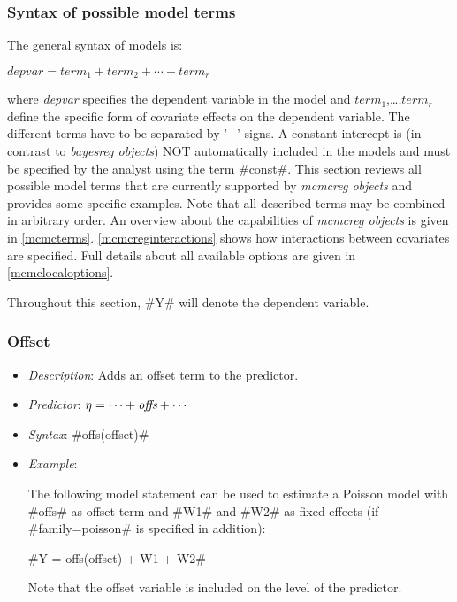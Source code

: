 \subsubsection{Syntax of possible model terms}
\label{mcmcregmodelsyntax}

The general syntax of models is:

$depvar = term_1 + term_2 + \cdots + term_r$

where {\em depvar} specifies the dependent variable in the model
and $term_1$,\dots,$term_r$ define the specific form of covariate
effects on the dependent variable. The different terms have to be
separated by '+' signs. A constant intercept is (in contrast to
{\em bayesreg objects}) NOT automatically
included in the models and must be specified by the
analyst using the term #const#. This section reviews all possible model terms that are
currently supported by {\em mcmcreg objects} and provides some
specific examples. Note that all described terms may be combined
in arbitrary order. An overview about the capabilities of {\em
mcmcreg objects} is given in \autoref{mcmcterms}.
\autoref{mcmcreginteractions} shows how interactions between
covariates are specified. Full details about all available options
are given in \autoref{mcmclocaloptions}.

Throughout this section, #Y# will denote the dependent variable.

\subsubsection*{Offset}

\begin{itemize}
\item[] {\em Description}: Adds an offset term to the predictor.
\item[] {\em Predictor}: $\eta =  \cdots + \mbox{\it offs} + \cdots$
\item[] {\em Syntax}: #offs(offset)#
\item[] {\em Example}:

The following model statement can be used to estimate a Poisson
model with #offs# as offset term and #W1# and #W2# as fixed
effects (if #family=poisson# is specified in addition):

#Y = offs(offset) + W1 + W2#

Note that the offset variable is included on the level of the predictor.
\end{itemize}

